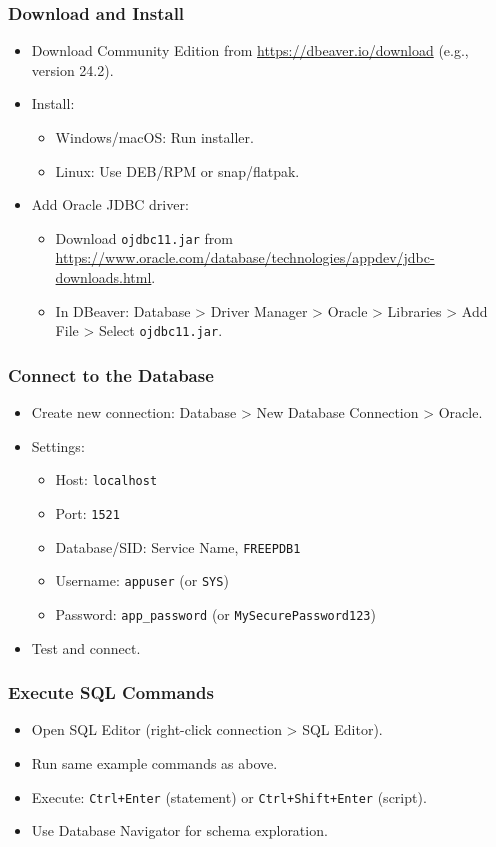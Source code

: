 \documentclass[a4paper,12pt]{article}
\begin{document}
\subsubsection{Download and Install}
\begin{itemize}
  \item Download Community Edition from \url{https://dbeaver.io/download} (e.g., version 24.2).
  \item Install:
    \begin{itemize}
      \item Windows/macOS: Run installer.
      \item Linux: Use DEB/RPM or snap/flatpak.
    \end{itemize}
  \item Add Oracle JDBC driver:
    \begin{itemize}
      \item Download \texttt{ojdbc11.jar} from \url{https://www.oracle.com/database/technologies/appdev/jdbc-downloads.html}.
      \item In DBeaver: Database > Driver Manager > Oracle > Libraries > Add File > Select \texttt{ojdbc11.jar}.
    \end{itemize}
\end{itemize}

\subsubsection{Connect to the Database}
\begin{itemize}
  \item Create new connection: Database > New Database Connection > Oracle.
  \item Settings:
    \begin{itemize}
      \item Host: \texttt{localhost}
      \item Port: \texttt{1521}
      \item Database/SID: Service Name, \texttt{FREEPDB1}
      \item Username: \texttt{appuser} (or \texttt{SYS})
      \item Password: \texttt{app_password} (or \texttt{MySecurePassword123})
    \end{itemize}
  \item Test and connect.
\end{itemize}

\subsubsection{Execute SQL Commands}
\begin{itemize}
  \item Open SQL Editor (right-click connection > SQL Editor).
  \item Run same example commands as above.
  \item Execute: \texttt{Ctrl+Enter} (statement) or \texttt{Ctrl+Shift+Enter} (script).
  \item Use Database Navigator for schema exploration.
\end{itemize}
\end{document}
